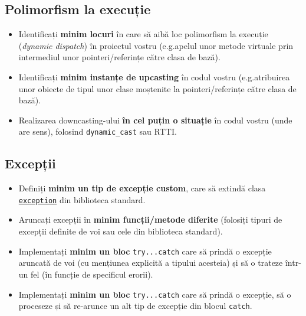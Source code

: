 \subsection*{Polimorfism la execuție}

\begin{itemize}
    \item Identificați \textbf{minim   \fi locuri} în care să aibă loc polimorfism la execuție (\emph{dynamic dispatch}) în proiectul vostru (e.g.\@ apelul unor metode virtuale prin intermediul unor pointeri/referințe către clasa de bază).

    \item Identificați \textbf{minim   \fi instanțe de upcasting} în codul vostru (e.g.\@ atribuirea unor obiecte de tipul unor clase moștenite la pointeri/referințe către clasa de bază).
    
    \item Realizarea downcasting-ului \textbf{în cel puțin o situație} în codul vostru (unde are sens), folosind \texttt{dynamic\_cast} sau RTTI.
\end{itemize}

\subsection*{Excepții}

\begin{itemize}
    \item Definiți \textbf{minim un tip de excepție custom}, care să extindă clasa \href{https://cplusplus.com/reference/exception/exception/}{\texttt{exception}} din biblioteca standard.

    \item Aruncați excepții în \textbf{minim   \fi funcții/metode diferite} (folosiți tipuri de excepții definite de voi sau cele din biblioteca standard).

    \item Implementați \textbf{minim un bloc} \texttt{try...catch} care să prindă o excepție aruncată de voi (cu mențiunea explicită a tipului acesteia) și să o trateze într-un fel (în funcție de specificul erorii).

    \item Implementați \textbf{minim un bloc} \texttt{try...catch} care să prindă o excepție, să o proceseze și să re-arunce un alt tip de excepție din blocul \texttt{catch}.
\end{itemize}

